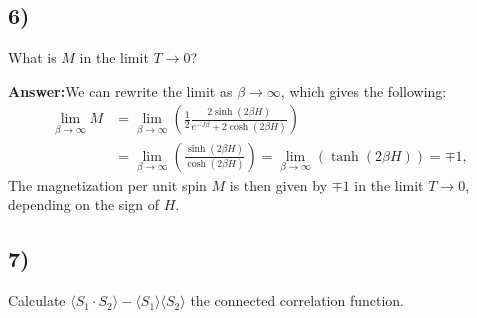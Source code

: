 \documentclass[a4paper]{article}
\newcommand{\newparagraph}{\vspace{.5cm}\noindent}
\newcommand{\average}[1]{\langle #1 \rangle}
\begin{document}
\begin{comment}
    &= - k_bT\left[2\beta e^{-\beta J }\sinh\left(\beta[H_1 - H_2]\right) + \beta\right]\cdot\tanh\left[2e^{-\beta J}\cosh\left(\beta[H_2 - H_1]\right) + \beta(H_1 + H_2)\right].
\end{align*}One has that $H_1 = H_2 = H$ and thus:
\begin{align*}
    M &= \frac{1}{2}\left(\average{S_1} + \average{S_2}\right)\\
    &= -\frac{k_bT}{2}\left(\left[\beta\right]\tanh\left[2e^{-\beta J} + 2H\beta\right] + \left[\beta\right]\tanh\left[2e^{-\beta J} + 2H\beta\right]\right)\\
    &= -\tanh\left[2e^{-\beta J} + 2H\beta\right]
\end{align*}
\end{comment}

\subsection*{6)}
What is $M$ in the limit $T\to 0$?

\newparagraph
\textbf{Answer:}We can rewrite the limit as $\beta\to\infty$, which gives the following:
\begin{align*}
    \lim_{\beta\to\infty}M&= \lim_{\beta\to\infty}\left(\frac{1}{2}\frac{2 \sinh(2\beta H)}{e^{-J\beta} + 2\cosh(2\beta H)}\right)\\
    &= \lim_{\beta\to\infty}\left(\frac{\sinh(2\beta H)}{\cosh(2\beta H)}\right) = \lim_{\beta\to\infty}\left(\tanh(2\beta H)\right) = \mp 1,
\end{align*}The magnetization per unit spin $M$ is then given by $\mp 1$ in the limit $T\to 0$, depending on the sign of $H$.

\subsection*{7)}
Calculate $\average{S_1 \cdot S_2} - \average{S_1}\average{S_2}$ the connected correlation function.
\end{document}
